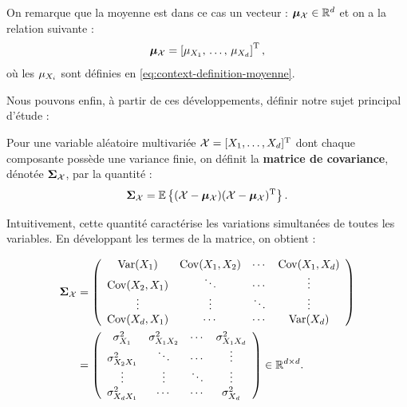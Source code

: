 \begin{remark}
  On remarque que la moyenne est dans ce cas un vecteur :
  $\boldsymbol{\mu}_{\mathcal{X}}\in\mathbb{R}^d$ et on a la relation suivante :
\begin{equation}
  \boldsymbol{\mu}_{\mathcal{X}}
  =
  \left[
    \mu_{X_1},\,
    \dots,\,
    \mu_{X_d}
  \right]^{\mathrm{T}},
\end{equation}
  où les $\mu_{X_i}$ sont définies en
  \cref{eq:context-definition-moyenne}.
\end{remark}


Nous pouvons enfin, à partir de ces développements, définir notre sujet
principal d'étude :

\begin{definition}
\label{def:context-definition-covariance-matrix}
  Pour une variable aléatoire multivariée
  $\mathcal{X}=[X_1,\dots,X_d]^{\mathrm{T}}$ dont chaque
  composante possède une variance finie, on définit la
  \textbf{matrice de covariance}, dénotée $\boldsymbol{\Sigma}_{\mathcal{X}}$, par la
  quantité :
\begin{equation}
  \boldsymbol{\Sigma}_{\mathcal{X}}
  =
  \operatorname{\mathbb{E}}\left\{
    (\mathcal{X}-\boldsymbol{\mu}_{\mathcal{X}})
    (\mathcal{X}-\boldsymbol{\mu}_{\mathcal{X}})^{\mathrm{T}}
  \right\}.
  \label{eq:context-definition-matricecovariance}
\end{equation}
\end{definition}


Intuitivement, cette quantité caractérise les variations simultanées
de toutes les variables. En développant les termes de la matrice, on
obtient :

\begin{equation}
\begin{aligned}
  \boldsymbol{\Sigma}_{\mathcal{X}}
  &=
  \left(
  \begin{array}{cccc}
    \operatorname{\operatorname{Var}}(X_1)
    & \operatorname{\operatorname{Cov}}(X_1,X_2)
    & \cdots
    & \operatorname{\operatorname{Cov}}(X_1,X_d)
    \\
    \operatorname{\operatorname{Cov}}(X_2,X_1)
    & \ddots
    & \cdots
    & \vdots
    \\
    \vdots
    & \vdots
    & \ddots
    & \vdots
    \\
    \operatorname{\operatorname{Cov}}(X_d,X_1)
    & \cdots
    & \cdots
    & \operatorname{\operatorname{Var}}(X_d)
  \end{array}
  \right)
  \\
  &=
  \left(
  \begin{array}{cccc}
    \sigma^2_{X_1}
    & \sigma^2_{X_1X_2}
    & \cdots
    & \sigma^2_{X_1X_d}
    \\
    \sigma^2_{X_2X_1}
    & \ddots
    & \cdots
    & \vdots
    \\
    \vdots
    & \vdots
    & \ddots
    & \vdots
    \\
    \sigma^2_{X_dX_1}
    & \cdots
    & \cdots
    & \sigma^2_{X_d}
  \end{array}
  \right)
  \in\mathbb{R}^{d\times d}.
\end{aligned}
\end{equation}

